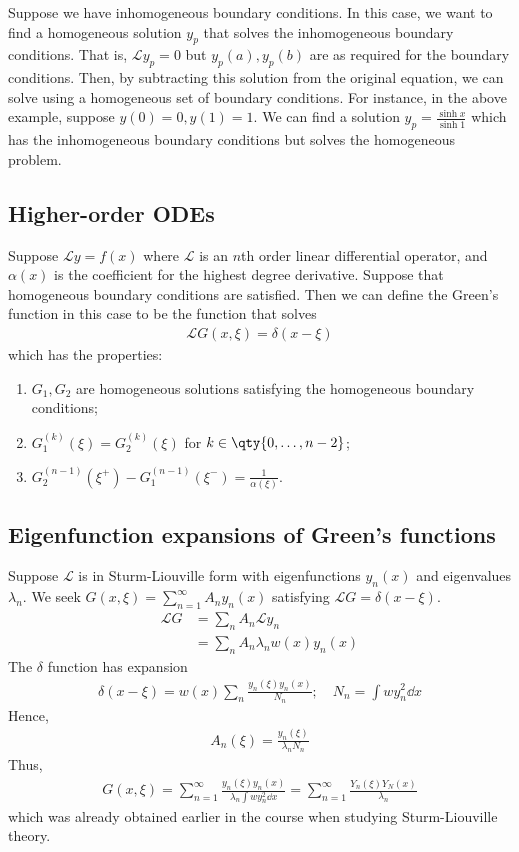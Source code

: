 \noindent Suppose we have inhomogeneous boundary conditions.
In this case, we want to find a homogeneous solution $y_p$ that solves the inhomogeneous boundary conditions.
That is, $\mathcal L y_p = 0$ but $y_p(a), y_p(b)$ are as required for the boundary conditions.
Then, by subtracting this solution from the original equation, we can solve using a homogeneous set of boundary conditions.
For instance, in the above example, suppose $y(0) = 0, y(1) = 1$.
We can find a solution $y_p = \frac{\sinh x}{\sinh 1}$ which has the inhomogeneous boundary conditions but solves the homogeneous problem.

\subsection{Higher-order ODEs}
Suppose $\mathcal L y = f(x)$ where $\mathcal L$ is an $n$th order linear differential operator, and $\alpha(x)$ is the coefficient for the highest degree derivative.
Suppose that homogeneous boundary conditions are satisfied.
Then we can define the Green's function in this case to be the function that solves
\begin{align*}
	\mathcal L G(x,\xi) = \delta(x-\xi)
\end{align*}
which has the properties:
\begin{enumerate}
	\item $G_1, G_2$ are homogeneous solutions satisfying the homogeneous boundary conditions;
	\item $G_1^{(k)}(\xi) = G_2^{(k)}(\xi)$ for $k \in \qty{0, \dots, n-2}$;
	\item $G_2^{(n-1)}(\xi^+) - G_1^{(n-1)}(\xi^-) = \frac{1}{\alpha(\xi)}$.
\end{enumerate}

\subsection{Eigenfunction expansions of Green's functions}
Suppose $\mathcal L$ is in Sturm-Liouville form with eigenfunctions $y_n(x)$ and eigenvalues $\lambda_n$.
We seek $G(x,\xi) = \sum_{n=1}^\infty A_n y_n(x)$ satisfying $\mathcal L G = \delta(x-\xi)$.
\begin{align*}
	\mathcal L G &= \sum_n A_n \mathcal L y_n \\
	&= \sum_n A_n \lambda_n w(x) y_n(x)
\end{align*}
The $\delta$ function has expansion
\begin{align*}
	\delta(x-\xi) = w(x) \sum_n \frac{y_n(\xi) y_n(x)}{N_n};\quad N_n = \int w y_n^2 \dd{x}
\end{align*}
Hence,
\begin{align*}
	A_n(\xi) = \frac{y_n(\xi)}{\lambda_n N_n}
\end{align*}
Thus,
\begin{align*}
	G(x,\xi) = \sum_{n=1}^\infty \frac{y_n(\xi) y_n(x)}{\lambda_n \int w y_n^2 \dd{x}} = \sum_{n=1}^\infty \frac{Y_n(\xi) Y_N(x)}{\lambda_n}
\end{align*}
which was already obtained earlier in the course when studying Sturm-Liouville theory.

